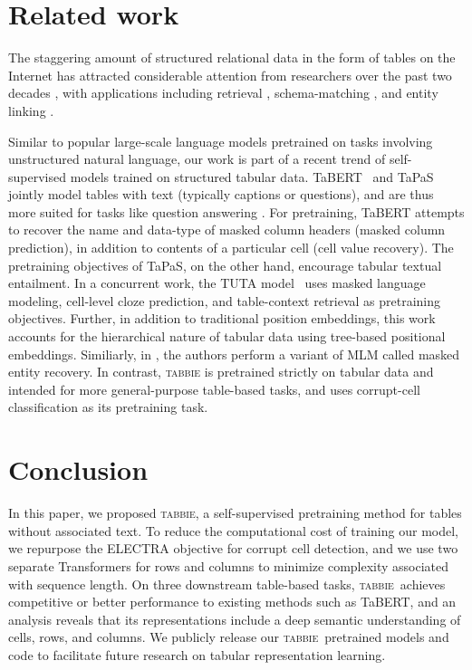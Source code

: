 \documentclass[11pt]{article}
\newcommand{\name}[0]{\textsc{tabbie}}
\begin{document}
 \section{Related work}
\label{sec:related_work}
The staggering amount of structured relational data in the form of tables on the  Internet has attracted considerable attention from researchers over the past two decades \cite{webtables, limaye-annotating, venetis-recovering, yago, Embley2006TableprocessingPA}, with applications including retrieval \cite{dassarma-finding}, schema-matching \cite{madhavan-schema-2, madhavan-schema-1}, and entity linking \cite{Zhang-entity-linking}. 
    
    Similar to popular large-scale language models pretrained on tasks involving unstructured natural language\cite{Peters:2018,devlin2018bert, Liu2019RoBERTaAR}, our work is part of a recent trend of self-supervised models trained on structured tabular data. TaBERT~\cite{yin20acl} and TaPaS~\cite{Herzig2020TAPASWS} jointly model tables with text (typically captions or questions), and are thus more suited for tasks like question answering  \cite{pasupat2015compositional}. For pretraining, TaBERT attempts to recover the name and data-type of masked column headers (masked column prediction), in addition to contents of a particular cell (cell value recovery). The pretraining objectives of TaPaS, on the other hand, encourage tabular textual entailment. In a concurrent work, the TUTA model~\cite{Wang2020StructureawarePF} uses masked language modeling, cell-level cloze prediction, and table-context retrieval as pretraining objectives. Further, in addition to traditional position embeddings, this work accounts for the hierarchical nature of tabular data using tree-based positional embeddings. Similiarly, in \citet{turl}, the authors perform a variant of MLM called masked entity recovery. In contrast, {\name} is pretrained strictly on tabular data and intended for more general-purpose table-based tasks, and uses corrupt-cell classification as its pretraining task. 
%
 \section{Conclusion}
\label{sec:conclusion}

In this paper, we proposed \name, a self-supervised pretraining method for tables without associated text. To reduce the computational cost of training our model, we repurpose the ELECTRA objective for corrupt cell detection, and we use two separate Transformers for rows and columns to minimize complexity associated with sequence length. On three downstream table-based tasks, \name\ achieves competitive or better performance to existing methods such as TaBERT, and an analysis reveals that its representations include a deep semantic understanding of cells, rows, and columns. We publicly release our \name\ pretrained models and code to facilitate future research on tabular representation learning.
\end{document}

